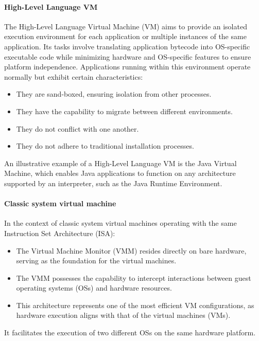 \paragraph*{High-Level Language VM}
The High-Level Language Virtual Machine (VM) aims to provide an isolated execution environment for each application or multiple instances of the same application. 
Its tasks involve translating application bytecode into OS-specific executable code while minimizing hardware and OS-specific features to ensure platform independence.
Applications running within this environment operate normally but exhibit certain characteristics:
\begin{itemize}
    \item They are sand-boxed, ensuring isolation from other processes.
    \item They have the capability to migrate between different environments.
    \item They do not conflict with one another.
    \item They do not adhere to traditional installation processes.
\end{itemize}
An illustrative example of a High-Level Language VM is the Java Virtual Machine, which enables Java applications to function on any architecture supported by an interpreter, such as the Java Runtime Environment.

\paragraph*{Classic system virtual machine}
In the context of classic system virtual machines operating with the same Instruction Set Architecture (ISA):
\begin{itemize}
    \item The Virtual Machine Monitor (VMM) resides directly on bare hardware, serving as the foundation for the virtual machines.
    \item The VMM possesses the capability to intercept interactions between guest operating systems (OSs) and hardware resources.
    \item This architecture represents one of the most efficient VM configurations, as hardware execution aligns with that of the virtual machines (VMs).
\end{itemize}
It facilitates the execution of two different OSs on the same hardware platform.

